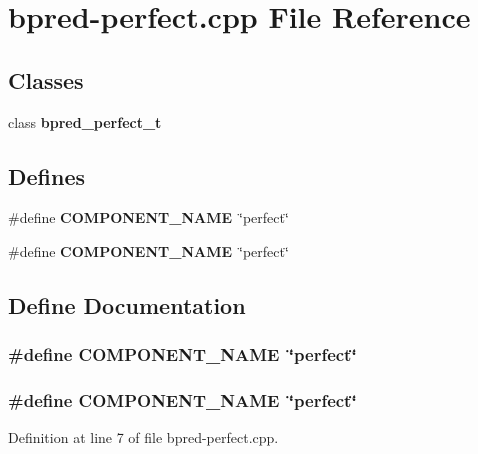 \section{bpred-perfect.cpp File Reference}
\label{bpred-perfect_8cpp}
\subsection*{Classes}
\begin{CompactItemize}
\item 
class {\bf bpred\_\-perfect\_\-t}
\end{CompactItemize}
\subsection*{Defines}
\begin{CompactItemize}
\item 
\#define {\bf COMPONENT\_\-NAME}~\char`\"{}perfect\char`\"{}
\item 
\#define {\bf COMPONENT\_\-NAME}~\char`\"{}perfect\char`\"{}
\end{CompactItemize}


\subsection{Define Documentation}
\subsubsection[{COMPONENT\_\-NAME}]{\setlength{\rightskip}{0pt plus 5cm}\#define COMPONENT\_\-NAME~\char`\"{}perfect\char`\"{}}\label{zesto-bpred_8cpp_9146ade7ce24e3db226a973a59063892}


\subsubsection[{COMPONENT\_\-NAME}]{\setlength{\rightskip}{0pt plus 5cm}\#define COMPONENT\_\-NAME~\char`\"{}perfect\char`\"{}}\label{bpred-perfect_8cpp_9146ade7ce24e3db226a973a59063892}




Definition at line 7 of file bpred-perfect.cpp.